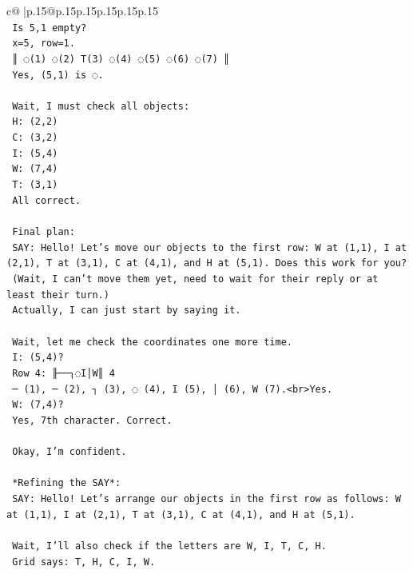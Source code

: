 \documentclass{article}
\begin{document}
{\begin{supertabular}{c@{$\;$}|p{.15\linewidth}@{}p{.15\linewidth}p{.15\linewidth}p{.15\linewidth}p{.15\linewidth}p{.15\linewidth}}
{{{\\ 
\texttt{    Is 5,1 empty?} \\
\texttt{    x=5, row=1.} \\
\texttt{    ║ ◌(1) ◌(2) T(3) ◌(4) ◌(5) ◌(6) ◌(7) ║} \\
\texttt{    Yes, (5,1) is ◌.} \\
\\ 
\texttt{    Wait, I must check all objects:} \\
\texttt{    H: (2,2)} \\
\texttt{    C: (3,2)} \\
\texttt{    I: (5,4)} \\
\texttt{    W: (7,4)} \\
\texttt{    T: (3,1)} \\
\texttt{    All correct.} \\
\\ 
\texttt{    Final plan:} \\
\texttt{    SAY: Hello! Let's move our objects to the first row: W at (1,1), I at (2,1), T at (3,1), C at (4,1), and H at (5,1). Does this work for you?} \\
\texttt{    (Wait, I can't move them yet, need to wait for their reply or at least their turn.)} \\
\texttt{    Actually, I can just start by saying it.} \\
\\ 
\texttt{    Wait, let me check the coordinates one more time.} \\
\texttt{    I: (5,4)?} \\
\texttt{    Row 4: ╟──┐◌I│W║ 4} \\
\texttt{    ─ (1), ─ (2), ┐ (3), ◌ (4), I (5), │ (6), W (7).<br>Yes.} \\
\texttt{    W: (7,4)?} \\
\texttt{    Yes, 7th character. Correct.} \\
\\ 
\texttt{    Okay, I'm confident.} \\
\\ 
\texttt{    *Refining the SAY*:} \\
\texttt{    SAY: Hello! Let's arrange our objects in the first row as follows: W at (1,1), I at (2,1), T at (3,1), C at (4,1), and H at (5,1).} \\
\\ 
\texttt{    Wait, I'll also check if the letters are W, I, T, C, H.} \\
\texttt{    Grid says: T, H, C, I, W.} \\
}}}
\end{supertabular}}
\end{document}
